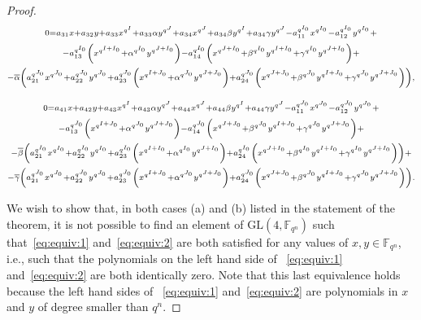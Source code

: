 \documentclass[11pt]{article}
\theoremstyle{definition}
\numberwithin{equation}{section}
\begin{document}
\begin{proof}
\begin{gather}
\label{eq:equiv:1}
       \scriptstyle 0 = a_{31}x + a_{32} y  + a_{33}x^{q^I} + a_{33}\alpha y ^{q^J} + a_{34}x^{q^J} + a_{34}\beta y ^{q^I} + a_{34}\gamma  y ^{q^J} - a_{11}^{q^{I_0}}x^{q^{I_0}} - a_{12}^{q^{I_0}} y ^{q^{I_0}} + \\
        \scriptstyle \notag - a_{13}^{q^{I_0}}\left(x^{q^{I + I_0}} + \alpha^{q^{I_0}} y ^{q^{J + I_0}}\right) - a_{14}^{q^{I_0}}\left(x^{q^{J + I_0}} + \beta^{q^{I_0}} y ^{q^{I + I_0}} + \gamma^{q^{I_0}} y ^{q^{J + I_0}}\right) + \\
       \scriptstyle \notag - \overline{\alpha}\left(a_{21}^{q^{J_0}}x^{q^{J_0}} + a_{22}^{q^{J_0}} y ^{q^{J_0}} +  a_{23}^{q^{J_0}}\left(x^{q^{I + J_0}} + \alpha^{q^{J_0}} y ^{q^{J + J_0}}\right) +  a_{24}^{q^{J_0}}\left(x^{q^{J + J_0}}  + \beta^{q^{J_0}} y ^{q^{I + J_0}} +  \gamma^{q^{J_0}} y ^{q^{J + J_0}}\right)\right),
\end{gather}

\begin{gather}
\label{eq:equiv:2}
       \scriptstyle 0 = a_{41}x + a_{42} y  + a_{43}x^{q^I} + a_{43}\alpha y ^{q^J} + a_{44}x^{q^J} + a_{44}\beta y ^{q^I} + a_{44}\gamma  y ^{q^J} - a_{11}^{q^{J_0}}x^{q^{J_0}} - a_{12}^{q^{J_0}} y ^{q^{J_0}} + \\
      \scriptstyle \notag - a_{13}^{q^{J_0}}\left(x^{q^{I + J_0}} + \alpha^{q^{J_0}} y ^{q^{J + J_0}}\right) - a_{14}^{q^{J_0}}\left(x^{q^{J + J_0}} + \beta^{q^{J_0}} y ^{q^{I + J_0}} + \gamma^{q^{J_0}} y ^{q^{J + J_0}}\right) + \\
      \scriptstyle \notag  - \overline{\beta}\left(a_{21}^{q^{I_0}}x^{q^{I_0}}  +  a_{22}^{q^{I_0}} y ^{q^{I_0}}  +  a_{23}^{q^{I_0}}\left(x^{q^{I + I_0}}  +  \alpha^{q^{I_0}} y ^{q^{J + I_0}}\right)  +  a_{24}^{q^{I_0}}\left(x^{q^{J + I_0}}  +  \beta^{q^{I_0}} y ^{q^{I + I_0}}   +  \gamma^{q^{I_0}} y ^{q^{J + I_0}}\right)\right)+\\
       \scriptstyle \notag  - \overline{\gamma}\left(a_{21}^{q^{J_0}}x^{q^{J_0}}  +  a_{22}^{q^{J_0}} y ^{q^{J_0}}  +  a_{23}^{q^{J_0}}\left(x^{q^{I + J_0}}  +  \alpha^{q^{J_0}} y ^{q^{J + J_0}}\right)  +  a_{24}^{q^{J_0}}\left(x^{q^{J + J_0}}  +  \beta^{q^{J_0}} y ^{q^{I + J_0}}  +  \gamma^{q^{J_0}} y ^{q^{J + J_0}}\right)\right). 
\end{gather}

We wish to show that, in both cases (a) and (b) listed in the statement of the theorem, it is not possible to find an element of $\mathrm{GL}(4,\mathbb{F}_{q^n})$ such that~\eqref{eq:equiv:1} and~\eqref{eq:equiv:2} are both satisfied for any values of $x, y \in {\mathbb F}_{q^n}$, i.e., such that the polynomials on the left hand side of ~\eqref{eq:equiv:1} and~\eqref{eq:equiv:2} are both identically zero. Note that this last equivalence holds because the left hand sides of ~\eqref{eq:equiv:1} and~\eqref{eq:equiv:2} are polynomials in $x$ and $ y $ of degree smaller than $q^n$.


\end{proof}
\end{document}

